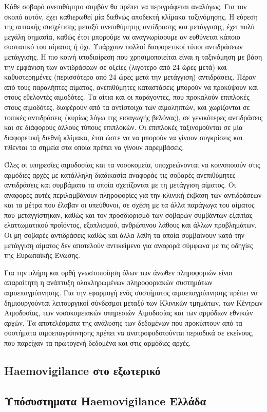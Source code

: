 	Κάθε σοβαρό ανεπιθύμητο συμβάν θα πρέπει να περιγράφεται αναλόγως. Για τον σκοπό αυτόν, έχει καθιερωθεί μία διεθνώς αποδεκτή κλίμακα ταξινόμησης. Η εύρεση της αιτιακής συσχέτισης μεταξύ ανεπιθύμητης αντίδρασης και μετάγγισης, έχει πολύ μεγάλη σημασία, καθώς έτσι μπορούμε να αναγνωρίσουμε αν ευθύνεται κάποιο συστατικό του αίματος ή όχι. Υπάρχουν πολλοί διαφορετικοί τύποι αντιδράσεων μετάγγισης. Η πιο κοινή υποδιαίρεση που χρησιμοποιείται είναι η ταξινόμηση με βάση την εμφάνιση των αντιδράσεων σε οξείες (λιγότερο από 24 ώρες μετά) και καθυστερημένες (περισσότερο από 24 ώρες μετά την μετάγγιση) αντιδράσεις. Πέραν από τους παραλήπτες αίματος, ανεπιθύμητες καταστάσεις μπορούν να προκύψουν και στους εθελοντές αιμοδότες. Τα αίτια και οι παράγοντες, που προκαλούν επιπλοκές στους αιμοδότες, διαφέρουν από τα αντίστοιχα των αιμοληπτών, και χωρίζονται σε τοπικές αντιδράσεις (κυρίως λόγω της εισαγωγής βελόνας), σε γενικότερες αντιδράσεις και σε διάφορους άλλους τύπους επιπλοκών. Οι επιπλοκές ταξινομούνται σε μία διαφορετική διεθνή κλίμακα, έτσι ώστε να να μπορούν να γίνουν συγκρίσεις και τίθενται τα σημεία στα οποία πρέπει να γίνουν παρεμβάσεις. 
 	
		Όλες οι υπηρεσίες αιμοδοσίας και τα νοσοκομεία, υποχρεώνονται να κοινοποιούν στις αρμόδιες αρχές με κατάλληλη διαδικασία αναφοράς τις σοβαρές ανεπιθύμητες αντιδράσεις και συμβάματα τα οποία σχετίζονται με τη μετάγγιση αίματος. Οι αναφορές αυτές περιλαμβάνουν πληροφορίες για την κλινική έκβαση των αντιδράσεων και τα μέτρα που έλαβαν οι υπεύθυνοι, σε σχέση με τα άλλα παράγωγα του αίματος που μεταγγίστηκαν, καθώς και τον προσδιορισμό των σοβαρών συμβάντων εξαιτίας ελαττωματικού προϊόντος, εξοπλισμού, ανθρώπινου λάθους και άλλων προβλημάτων.\cite{cite-revekka} Οι μη σοβαρές αντιδράσεις καθώς και άλλα λάθη τα οποία συμβαίνουν κατά την μετάγγιση αίματος δεν αποτελούν αντικείμενο για αναφορά σύμφωνα με τις οδηγίες της Ευρωπαϊκής Ένωσης.
		
		Για την πλήρη και ορθή γνωστοποίηση όλων των άνωθεν πληροφοριών είναι απαραίτητη η ανάπτυξη ολοκληρωμένων πληροφοριακών συστημάτων αιμοεπαγρύπνησης. Για την εφαρμογή ενός συστήματος αιμοεπαγρύπνησης πρέπει να δημιουργούνται λειτουργικοί σύνδεσμοι μεταξύ των Κλινικών τμημάτων, των Κέντρων Αιμοδοσίας, των νοσοκομειακών υπηρεσιών Αιμοδοσίας και των αρμόδιων εθνικών αρχών. Τα αποτελέσματα της ανάλυσης των δεδομένων που προκύπτουν από τα συστήματα αιμοεπαγρύπνησης πρέπει να ανατροφοδοτούνται περιοδικά σε εκείνους, που παρείχαν τα πρωτογενή δεδομένα και στις αρμόδιες αρχές.
		
	\subsection{Haemovigilance στο εξωτερικό}
	
	
	
	\subsection{Υπόσυστηματα Haemovigilance Ελλάδα}
